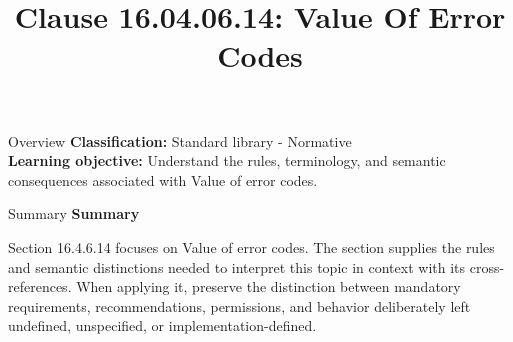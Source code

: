 \documentclass[10pt,letterpaper]{article}
\title{Clause 16.04.06.14: Value Of Error Codes}
\author{}
\date{}
\begin{document}
\maketitle
\begin{CornellOverviewBox}{Overview}
\textbf{Classification:} Standard library - Normative\\[2pt]
\textbf{Learning objective:} Understand the rules, terminology, and semantic consequences associated with Value of error codes.
\end{CornellOverviewBox}\begin{CornellSummaryBox}{Summary}
{\sffamily\bfseries\color{Accent} Summary}\par\vspace{3pt}Section 16.4.6.14 focuses on Value of error codes. The section supplies the rules and semantic distinctions needed to interpret this topic in context with its cross-references. When applying it, preserve the distinction between mandatory requirements, recommendations, permissions, and behavior deliberately left undefined, unspecified, or implementation-defined.
\end{CornellSummaryBox}
\end{document}
